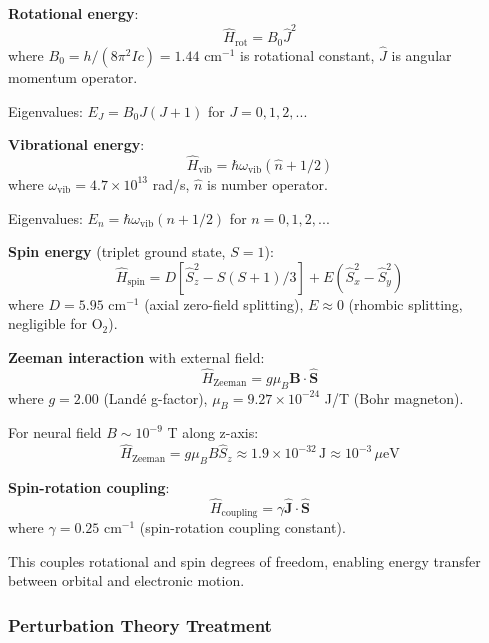 \documentclass[11pt,onecolumn]{article}
\begin{document}
\textbf{Rotational energy}:
\begin{equation}
\hat{H}_{\text{rot}} = B_0 \hat{J}^2
\end{equation}
where $B_0 = h/(8\pi^2 I c) = 1.44$ cm$^{-1}$ is rotational constant, $\hat{J}$ is angular momentum operator.

Eigenvalues: $E_J = B_0 J(J+1)$ for $J = 0, 1, 2, ...$

\textbf{Vibrational energy}:
\begin{equation}
\hat{H}_{\text{vib}} = \hbar\omega_{\text{vib}}(\hat{n} + 1/2)
\end{equation}
where $\omega_{\text{vib}} = 4.7 \times 10^{13}$ rad/s, $\hat{n}$ is number operator.

Eigenvalues: $E_n = \hbar\omega_{\text{vib}}(n + 1/2)$ for $n = 0, 1, 2, ...$

\textbf{Spin energy} (triplet ground state, $S=1$):
\begin{equation}
\hat{H}_{\text{spin}} = D[\hat{S}_z^2 - S(S+1)/3] + E(\hat{S}_x^2 - \hat{S}_y^2)
\end{equation}
where $D = 5.95$ cm$^{-1}$ (axial zero-field splitting), $E \approx 0$ (rhombic splitting, negligible for O$_2$).

\textbf{Zeeman interaction} with external field:
\begin{equation}
\hat{H}_{\text{Zeeman}} = g\mu_B \mathbf{B} \cdot \hat{\mathbf{S}}
\end{equation}
where $g = 2.00$ (Landé g-factor), $\mu_B = 9.27 \times 10^{-24}$ J/T (Bohr magneton).

For neural field $B \sim 10^{-9}$ T along z-axis:
\begin{equation}
\hat{H}_{\text{Zeeman}} = g\mu_B B \hat{S}_z \approx 1.9 \times 10^{-32}\,\text{J} \approx 10^{-3}\,\mu\text{eV}
\end{equation}

\textbf{Spin-rotation coupling}:
\begin{equation}
\hat{H}_{\text{coupling}} = \gamma \hat{\mathbf{J}} \cdot \hat{\mathbf{S}}
\end{equation}
where $\gamma = 0.25$ cm$^{-1}$ (spin-rotation coupling constant).

This couples rotational and spin degrees of freedom, enabling energy transfer between orbital and electronic motion.

\subsubsection{Perturbation Theory Treatment}
\end{document}
